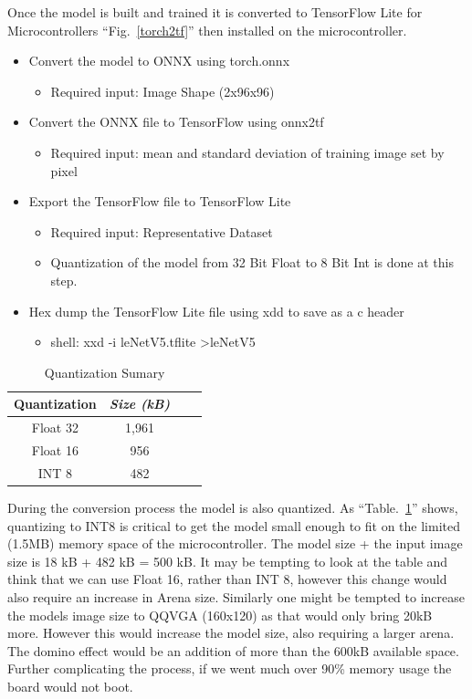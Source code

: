 \documentclass[conference]{IEEEtran}
\begin{document}
Once the model is built and trained it is converted to TensorFlow Lite for Microcontrollers ``Fig.~\ref{torch2tf}'' then installed on the microcontroller.
\begin{itemize}
	\item Convert the model to ONNX using torch.onnx
	\begin{itemize}
		\item Required input:  Image Shape (2x96x96)
	\end{itemize}
	\item Convert the ONNX file to TensorFlow using onnx2tf
	\begin{itemize}
		\item Required input:  mean and standard deviation of training image set by pixel
	\end{itemize}
	\item Export the TensorFlow file to TensorFlow Lite
	\begin{itemize}
		\item Required input: Representative Dataset
		\item Quantization of the model from 32 Bit Float to 8 Bit Int is done at this step.
	\end{itemize}
	\item Hex dump the TensorFlow Lite file using xdd to save as a c header
	\begin{itemize}
		\item shell: xxd -i leNetV5.tflite \textgreater leNetV5
	\end{itemize}
\end{itemize}




\begin{table}[htbp]
\caption{Quantization Sumary}
\begin{center}
\begin{tabular}{|c|c|c|c|}
\hline
\textbf{Quantization} & \textbf{\textit{Size (kB)}}    \\ \hline 
	Float 32& 1,961 \\ \hline 
	Float 16& 956 \\ \hline 
	INT 8& 482 \\ \hline 
\end{tabular}
\label{quantSum}
\end{center}
\end{table}

During the conversion process the model is also quantized. As ``Table.~\ref{quantSum}'' shows, quantizing to INT8 is critical to get the model small enough to fit on the limited (1.5MB) memory space of the microcontroller.
The model size + the input image size is 18 kB + 482 kB = 500 kB. It may be tempting to look at the table and think that we can use Float 16, rather than INT 8, however this change would also require an increase in Arena size. Similarly one might be tempted to increase the models image size to QQVGA (160x120) as that would only bring 20kB more. However this would increase the model size, also requiring a larger arena. The domino effect would be an addition of more than the 600kB available space. Further complicating the process, if we went much  over  90\% memory usage the board would not boot. 
\end{document}
